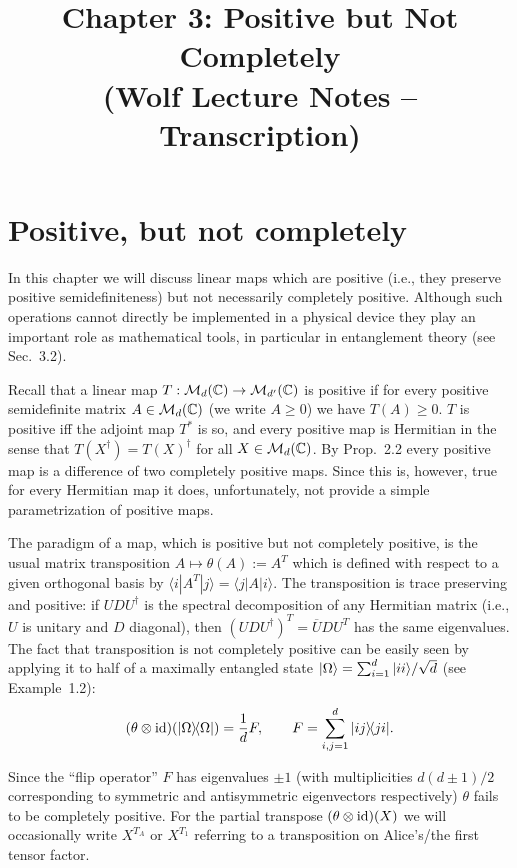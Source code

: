 \documentclass[11pt,a4paper]{article}
\title{Chapter 3: Positive but Not Completely \\ {\small (Wolf Lecture Notes -- Transcription)}}
\date{}
\numberwithin{equation}{section}
\begin{document}
\maketitle
\tableofcontents

\setcounter{section}{2}

\section{Positive, but not completely}

In this chapter we will discuss linear maps which are positive (i.e., they preserve
positive semidefiniteness) but not necessarily completely positive. Although
such operations cannot directly be implemented in a physical device they play
an important role as mathematical tools, in particular in entanglement theory
(see Sec.~3.2).

Recall that a linear map $T:\mathcal{M}_d(\mathbb{C})\to \mathcal{M}_{d'}(\mathbb{C})$ is positive if for every
positive semidefinite matrix $A\in \mathcal{M}_d(\mathbb{C})$ (we write $A\ge 0$) we have $T(A)\ge 0$.
$T$ is positive iff the adjoint map $T^*$ is so, and every positive map is Hermitian
in the sense that $T(X^\dagger)=T(X)^\dagger$ for all $X\in \mathcal{M}_d(\mathbb{C})$.
By Prop.~2.2 every positive map is a difference of two completely positive maps.
Since this is, however, true for every Hermitian map it does, unfortunately, not provide a
simple parametrization of positive maps.

The paradigm of a map, which is positive but not completely positive, is
the usual matrix transposition $A\mapsto \theta(A):=A^T$ which is defined with respect
to a given orthogonal basis by $\langle i|A^T|j\rangle=\langle j|A|i\rangle$.
The transposition is trace preserving and positive: if $UDU^\dagger$ is the spectral
decomposition of any Hermitian matrix (i.e., $U$ is unitary and $D$ diagonal), then
$(UDU^\dagger)^T=\overline{U}DU^T$ has the same eigenvalues. The fact that transposition is not
completely positive can be easily seen by applying it to half of a maximally entangled state
$|\Omega\rangle=\sum_{i=1}^d |ii\rangle/\sqrt{d}$ (see Example~1.2):
\begin{equation}\label{eq:ch3:3.1}
    (\theta\otimes \mathrm{id})(|\Omega\rangle\!\langle\Omega|)
    =\frac{1}{d}F,
    \qquad
    F=\sum_{i,j=1}^d |ij\rangle\!\langle ji|.
\end{equation}

Since the ``flip operator'' $F$ has eigenvalues $\pm 1$ (with multiplicities $d(d\pm 1)/2$
corresponding to symmetric and antisymmetric eigenvectors respectively) $\theta$ fails to be
completely positive. For the partial transpose $(\theta\otimes \mathrm{id})(X)$ we will occasionally
write $X^{T_A}$ or $X^{T_1}$ referring to a transposition on Alice's/the first tensor factor.
\end{document}
